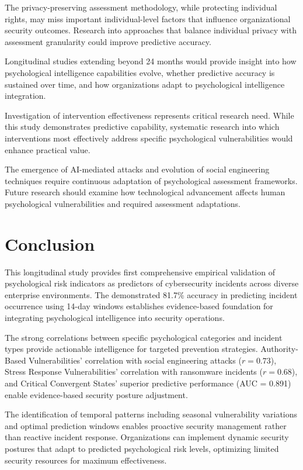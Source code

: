 \documentclass[10pt, twocolumn]{article}
\begin{document}
The privacy-preserving assessment methodology, while protecting individual rights, may miss important individual-level factors that influence organizational security outcomes. Research into approaches that balance individual privacy with assessment granularity could improve predictive accuracy.

Longitudinal studies extending beyond 24 months would provide insight into how psychological intelligence capabilities evolve, whether predictive accuracy is sustained over time, and how organizations adapt to psychological intelligence integration.

Investigation of intervention effectiveness represents critical research need. While this study demonstrates predictive capability, systematic research into which interventions most effectively address specific psychological vulnerabilities would enhance practical value.

The emergence of AI-mediated attacks and evolution of social engineering techniques require continuous adaptation of psychological assessment frameworks. Future research should examine how technological advancement affects human psychological vulnerabilities and required assessment adaptations.

\section{Conclusion}

This longitudinal study provides first comprehensive empirical validation of psychological risk indicators as predictors of cybersecurity incidents across diverse enterprise environments. The demonstrated 81.7\% accuracy in predicting incident occurrence using 14-day windows establishes evidence-based foundation for integrating psychological intelligence into security operations.

The strong correlations between specific psychological categories and incident types provide actionable intelligence for targeted prevention strategies. Authority-Based Vulnerabilities' correlation with social engineering attacks ($r = 0.73$), Stress Response Vulnerabilities' correlation with ransomware incidents ($r = 0.68$), and Critical Convergent States' superior predictive performance (AUC = 0.891) enable evidence-based security posture adjustment.

The identification of temporal patterns including seasonal vulnerability variations and optimal prediction windows enables proactive security management rather than reactive incident response. Organizations can implement dynamic security postures that adapt to predicted psychological risk levels, optimizing limited security resources for maximum effectiveness.
\end{document}
